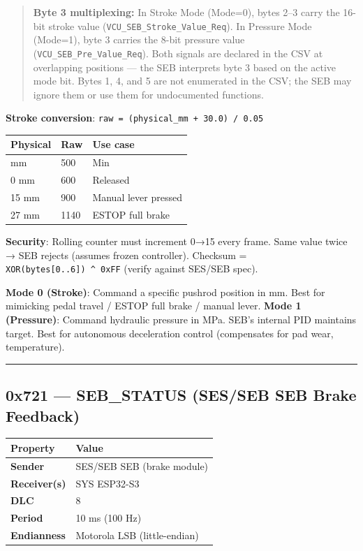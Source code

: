 \documentclass[12pt,a4paper,oneside]{report}
\begin{document}
\begin{quote}
\textbf{Byte 3 multiplexing:} In Stroke Mode (Mode=0), bytes 2--3 carry the
16-bit stroke value (\texttt{VCU\_SEB\_Stroke\_Value\_Req}). In Pressure Mode
(Mode=1), byte 3 carries the 8-bit pressure value
(\texttt{VCU\_SEB\_Pre\_Value\_Req}). Both signals are declared in the CSV at
overlapping positions --- the SEB interprets byte 3 based on the active mode
bit. Bytes 1, 4, and 5 are not enumerated in the CSV; the SEB may ignore them or
use them for undocumented functions.
\end{quote}

\textbf{Stroke conversion}: \texttt{raw\ =\ (physical\_mm\ +\ 30.0)\ /\ 0.05}

\begin{longtable}[]{@{}lll@{}}
\toprule\noalign{}
Physical & Raw & Use case \\
\midrule\noalign{}
\endhead
\bottomrule\noalign{}
\endlastfoot
-5 mm & 500 & Min \\
0 mm & 600 & Released \\
15 mm & 900 & Manual lever pressed \\
27 mm & 1140 & ESTOP full brake \\
\end{longtable}

\textbf{Security}: Rolling counter must increment 0→15 every frame. Same value
twice → SEB rejects (assumes frozen controller). Checksum =
\texttt{XOR(bytes{[}0..6{]})\ \^{}\ 0xFF} (verify against SES/SEB spec).

\textbf{Mode 0 (Stroke)}: Command a specific pushrod position in mm. Best for
mimicking pedal travel / ESTOP full brake / manual lever. \textbf{Mode 1
(Pressure)}: Command hydraulic pressure in MPa. SEB's internal PID maintains
target. Best for autonomous deceleration control (compensates for pad wear,
temperature).

\begin{center}\rule{0.5\linewidth}{0.5pt}\end{center}

\subsection{0x721 --- SEB\_STATUS (SES/SEB SEB Brake
Feedback)}\label{x721-seb_status-SES/SEB-seb-brake-feedback}

\begin{longtable}[]{@{}ll@{}}
\toprule\noalign{}
Property & Value \\
\midrule\noalign{}
\endhead
\bottomrule\noalign{}
\endlastfoot
\textbf{Sender} & SES/SEB SEB (brake module) \\
\textbf{Receiver(s)} & SYS ESP32-S3 \\
\textbf{DLC} & 8 \\
\textbf{Period} & 10 ms (100 Hz) \\
\textbf{Endianness} & Motorola LSB (little-endian) \\
\end{longtable}
\end{document}
